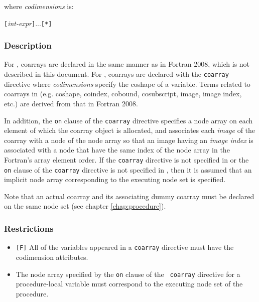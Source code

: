 where {\it codimensions} is:

\vspace{0.3cm}
\hspace{0.5cm} {\openb}{\tt [}{\it int-expr}{\tt ]}...{\closeb}{\tt [*]}

\subsubsection*{Description}

For {\XMPF}, coarrays are declared in the same manner as in Fortran
2008, which is not described in this document.
%
For {\XMPC}, coarrays are declared with the {\tt coarray} directive
where {\it codimensions} specify the coshape of a variable.
%
Terms related to coarrays in {\XMP} (e.g. coshape, coindex,
cobound, cosubscript, image, image index, etc.) are derived from that in
Fortran 2008.

In addition, the {\tt on} clause of the {\tt coarray} directive
specifies a node array on each element of which the coarray object is
allocated, and associates each {\it image} of the coarray with a node of
the node array so that an image having an {\it image index} is
associated with a node that have the same index of the node array in the
Fortran's array element order.
%
If the {\tt coarray} directive is not specified in {\XMPF} or the {\tt
on} clause of the {\tt coarray} directive is not specified in {\XMPC},
then it is assumed that an implicit node array corresponding to the
executing node set is specified.

Note that an actual coarray and its associating dummy coarray must be
declared on the same node set (see chapter \ref{chap:procedure}).

\subsubsection*{Restrictions}

\begin{itemize}
 \item \verb![F]! All of the variables appeared in a {\tt coarray}
       directive must have the codimension attributes.
 \item The node array specified by the {\tt on} clause of the {\tt
       coarray} directive for a procedure-local variable must
       correspond to the executing node set of the procedure.
\end{itemize}

